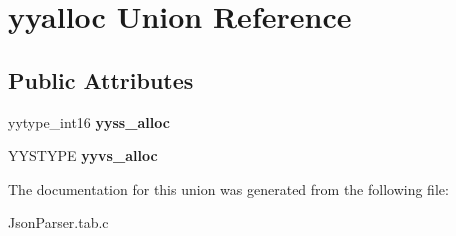 \hypertarget{unionyyalloc}{\section{yyalloc Union Reference}
\label{unionyyalloc}
}
\subsection*{Public Attributes}
\begin{DoxyCompactItemize}
\item 
\hypertarget{unionyyalloc_a4800e0520a89a4789afa7b5d82197e65}{yytype\-\_\-int16 {\bfseries yyss\-\_\-alloc}}\label{unionyyalloc_a4800e0520a89a4789afa7b5d82197e65}

\item 
\hypertarget{unionyyalloc_a9326f4fdc6f737a929444427836d8928}{Y\-Y\-S\-T\-Y\-P\-E {\bfseries yyvs\-\_\-alloc}}\label{unionyyalloc_a9326f4fdc6f737a929444427836d8928}

\end{DoxyCompactItemize}


The documentation for this union was generated from the following file\-:\begin{DoxyCompactItemize}
\item 
Json\-Parser.\-tab.\-c\end{DoxyCompactItemize}
